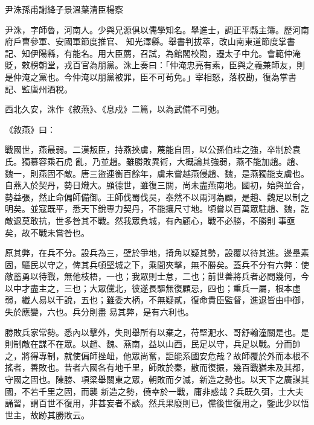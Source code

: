 
\begin{pinyinscope}

 尹洙孫甫謝絳子景溫葉清臣楊察



 尹洙，字師魯，河南人。少與兄源俱以儒學知名。舉進士，調正平縣主簿。歷河南府戶曹參軍、安國軍節度推官、
 知光澤縣。舉書判拔萃，改山南東道節度掌書記、知伊陽縣，有能名。用大臣薦，召試，為館閣校勘，遷太子中允。會範仲淹貶，敕榜朝堂，戎百官為朋黨。洙上奏曰：「仲淹忠亮有素，臣與之義兼師友，則是仲淹之黨也。今仲淹以朋黨被罪，臣不可茍免。」宰相怒，落校勘，復為掌書記、監唐州酒稅。



 西北久安，洙作《敘燕》、《息戍》二篇，以為武備不可弛。



 《敘燕》曰：



 戰國世，燕最弱。二漢叛臣，持燕挾虜，蔑能自固，以公孫伯珪之強，卒制於袁氏。獨慕容乘石虎
 亂，乃並趙。雖勝敗異術，大概論其強弱，燕不能加趙。趙、魏一，則燕固不敵。唐三盜連衡百餘年，虜未嘗越燕侵趙、魏，是燕獨能支虜也。自燕入於契丹，勢日熾大。顯德世，雖復三關，尚未盡燕南地。國初，始與並合，勢益張，然止命偏師備御。王師伐蜀伐吳，泰然不以兩河為顧，是趙、魏足以制之明矣。並寇既平，悉天下銳專力契丹，不能攘尺寸地。頃嘗以百萬眾駐趙、魏，訖敵退莫敢抗，世多咎其不戰。然我眾負城，有內顧心，戰不必勝，不勝則
 事亟矣，故不戰未嘗咎也。



 原其弊，在兵不分。設兵為三，壁於爭地，掎角以疑其勢，設覆以待其進。邊壘素固，驅民以守之，俾其兵頓堅城之下，乘間夾擊，無不勝矣。蓋兵不分有六弊：使敵蓄勇以待戰，無他枝梧，一也；我眾則士怠，二也；前世善將兵者必問幾何，今以中才盡主之，三也；大眾儻北，彼遂長驅無復顧忌，四也；重兵一屬，根本虛弱，纖人易以干說，五也；雖委大柄，不無疑貳，復命貴臣監督，進退皆由中御，失於應變，六也。兵分則盡
 易其弊，是有六利也。



 勝敗兵家常勢。悉內以擊外，失則舉所有以棄之，苻堅淝水、哥舒翰潼關是也。是則制敵在謀不在眾。以趙、魏、燕南，益以山西，民足以守，兵足以戰。分而帥之，將得專制，就使偏師挫衄，他眾尚奮，詎能系國安危哉？故師覆於外而本根不搖者，善敗也。昔者六國各有地千里，師敗於秦，散而復振，幾百戰猶未及其都，守國之固也。陳勝、項梁舉關東之眾，朝敗而夕滅，新造之勢也。以天下之廣謀其國，不若千里之固，而襲
 新造之勢，僥幸於一戰，庸非惑哉？兵既久弭，士大夫誦習，謂百世不復用，非甚妄者不談。然兵果廢則已，儻後世復用之，鑒此少以悟世主，故跡其勝敗云。




\end{pinyinscope}
